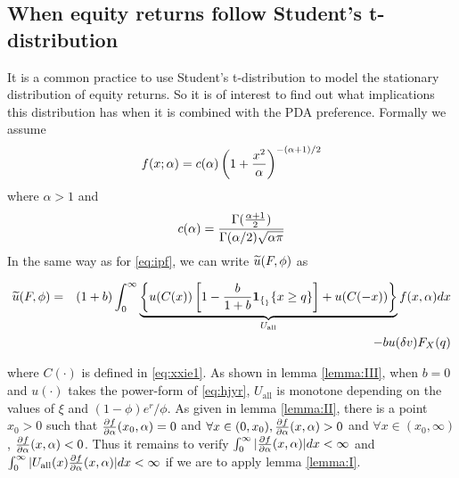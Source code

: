 \begin{subappendices}
\section{When equity returns follow Student's t-distribution}
\setcounter{equation}{0}
It is a common practice to use Student's t-distribution to model the
stationary distribution of equity returns. So it is of interest to
find out what implications this distribution has when it is combined
with the PDA preference. Formally we assume
\[
f(x; \alpha) = c(\alpha) \left(
  1 + {x^2 \over \alpha}
\right)^{-(\alpha + 1)/2}
\]
where $\alpha > 1$ and
\[
c(\alpha) = {
  \Gamma({\alpha + 1 \over 2})
  \over
  \Gamma(\alpha/2) \sqrt{\alpha \pi}
}
\]
In the same way as for \eqref{eq:ipf}, we can write $\widetilde u(F, \phi)$
as
\begin{small}
  \begin{eqnarray}
    \widetilde u(F, \phi)
    &=&
    (1 + b)
    \int_{0}^{\infty}
    \underbrace{
      \left\{
      u(C(x)) \left[
        1 - {b \over 1 + b}\mathbf{1}_{\{_\}}{\{x \ge q\}}
        \right]
      + u(C(-x))
      \right\}
    }_{U_{\text{all}}}
    f(x, \alpha) dx \nonumber \\
    && - b u(\delta v) F_X(q) \label{eq:t1}
  \end{eqnarray}
\end{small}
where $C(\cdot)$ is defined in \eqref{eq:xxie1}. As shown in lemma
\ref{lemma:III}, when $b = 0$ and $u(\cdot)$
takes the power-form of \eqref{eq:hjyr}, $U_{\text{all}}$ is monotone
depending on the values of $\xi$ and $(1 - \phi) e^r / \phi$. As given
in lemma \ref{lemma:II}, there is a point $x_0 > 0$ such that
${\partial f \over \partial \alpha}(x_0, \alpha) = 0$ and
$\forall x \in (0, x_0),
{\partial f \over  \partial \alpha}(x, \alpha) > 0$ and
$\forall x \in (x_0, \infty)$,
${\partial f \over \partial \alpha}(x, \alpha) < 0$. Thus it remains to verify
$\int_0^\infty |{\partial f \over \partial \alpha}(x, \alpha)| dx < \infty$ and
$\int_0^\infty |U_{\text{all}}(x){\partial f \over \partial \alpha}(x, \alpha)| dx < \infty$
if we are to apply lemma \ref{lemma:I}.


\end{subappendices}

